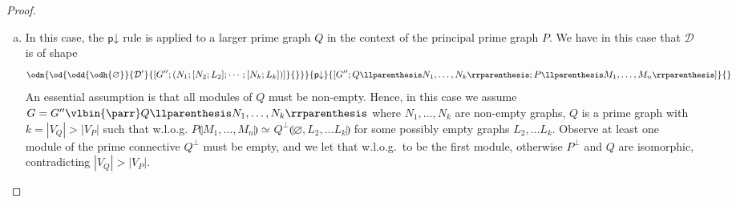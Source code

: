 \documentclass{lmcs} %
\newcommand{\isom}[1][]{\simeq_{#1}}
\renewcommand{\emptyset}{\varnothing}
\def\unit{\emptyset}
\newcommand{\connn}[1]{\llparenthesis#1\rrparenthesis}
\def\pdr{\dprule}
\def\ods#1#2#3#4{\od{\odd{\odh{#1}}{#2}{#3}{#4}}}
\def\cneg#1{{#1^\bot}}
\def\lpar{\vlbin{\parr}}
\def\prule{\mathsf{p}}
\def\dprule{\prule\mathord{\downarrow}}
\def\gG{G}
\def\gL{L}
\def\gM{M}
\def\gN{N}
\def\gP{P}
\def\gQ{Q}
\newcommand{\vertices}[1][]{V_{#1}}
\newcommand{\vP}{\vertices[P]}
\newcommand{\vQ}{\vertices[Q]}
\newcommand{\dD}{\mathcal{D}}
\newcommand{\sizeof}[1]{|#1|}
\theoremstyle{plain}
\begin{document}
\begin{proof}
\begin{enumerate}[(a)]
		
		
		
		
		\item\label{split:e}
		In this case, the $\pdr$ rule is applied to a larger prime graph $\gQ$ in the context of the principal prime graph $\gP$.
		We have in this case that 
		$\dD$ is of shape
		\begin{equation*}
			\small
			\odn{\ods{\unit}{
					\dD'}{
					[\gG'';(\gN_1 ;[\gN_2;\gL_2];\cdots;[\gN_k;\gL_k])]
				}{}}{
				\pdr}{
				[\gG'';\gQ\connn{\gN_1,\ldots,\gN_k}; \gP\connn{\gM_1,\ldots,\gM_n}]
			}{}
			\hskip-2em       
		\end{equation*}
		An essential assumption is that all modules of $\gQ$ must be non-empty. 
		Hence, in this case we assume
		$\gG=\gG''\lpar\gQ\connn{\gN_1,\ldots,\gN_k}$ where $\gN_1, \dots, \gN_k$ are non-empty graphs, 
		$\gQ$ is a prime graph with $k=\sizeof\vQ > \sizeof\vP$ 
		such that w.l.o.g.
		$\gP\connn{\gM_1,\ldots,\gM_n} \isom \cneg{\gQ}\connn{ \unit, \gL_2, \ldots \gL_k }$ 
		for some possibly empty graphs $\gL_2, \ldots \gL_k$. 
		Observe at least one module of the prime connective $\cneg{\gQ}$ must be empty, and we let that w.l.o.g.\ to be the first module, otherwise $\cneg\gP$ and $\gQ$ are isomorphic, contradicting $\sizeof\vQ > \sizeof\vP$.
		

\end{enumerate}
\end{proof}
\end{document}
